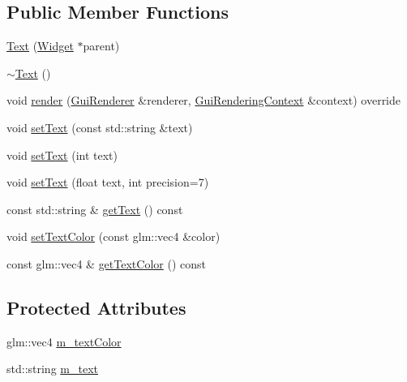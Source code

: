 \subsection*{Public Member Functions}
\begin{DoxyCompactItemize}
\item 
\mbox{\hyperlink{classec__gui_1_1_text_a92d72331de979f4972130bf7d342976f}{Text}} (\mbox{\hyperlink{classec__gui_1_1_widget}{Widget}} $\ast$parent)
\item 
\mbox{\hyperlink{classec__gui_1_1_text_abba2d725d3f9bf3502488d35ec216515}{$\sim$\+Text}} ()
\item 
void \mbox{\hyperlink{classec__gui_1_1_text_a08a431546765e0ff69951a4299193e7d}{render}} (\mbox{\hyperlink{classec__gui_1_1_gui_renderer}{Gui\+Renderer}} \&renderer, \mbox{\hyperlink{classec__gui_1_1_gui_rendering_context}{Gui\+Rendering\+Context}} \&context) override
\item 
void \mbox{\hyperlink{classec__gui_1_1_text_a9173cc788e806e2da2f0e55d5fb9cd85}{set\+Text}} (const std\+::string \&text)
\item 
void \mbox{\hyperlink{classec__gui_1_1_text_adfbe877f465d8fbb1effd64282602da9}{set\+Text}} (int text)
\item 
void \mbox{\hyperlink{classec__gui_1_1_text_aee0f2ce50293f723e17810905c73fc6a}{set\+Text}} (float text, int precision=7)
\item 
const std\+::string \& \mbox{\hyperlink{classec__gui_1_1_text_a3018ee6893cbe4f84310781f1f1a0d7c}{get\+Text}} () const
\item 
void \mbox{\hyperlink{classec__gui_1_1_text_a0924e7ca4575fe394615422064723ddc}{set\+Text\+Color}} (const glm\+::vec4 \&color)
\item 
const glm\+::vec4 \& \mbox{\hyperlink{classec__gui_1_1_text_acfa0992c94a969b45509f8ab1d23ce4e}{get\+Text\+Color}} () const
\end{DoxyCompactItemize}
\subsection*{Protected Attributes}
\begin{DoxyCompactItemize}
\item 
glm\+::vec4 \mbox{\hyperlink{classec__gui_1_1_text_af90729dfed09a3c4c94ed03e5769001e}{m\+\_\+text\+Color}}
\item 
std\+::string \mbox{\hyperlink{classec__gui_1_1_text_a97780a155cc50f0d83fe5149e006b938}{m\+\_\+text}}
\end{DoxyCompactItemize}
